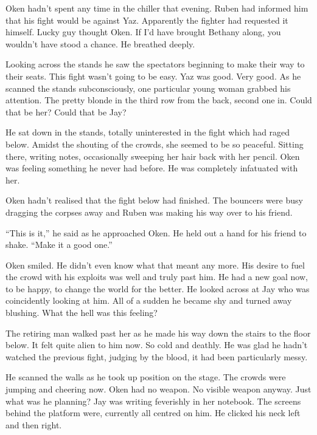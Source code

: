 \thoughtbreak



Oken hadn't spent any time in the chiller that evening.  Ruben had informed him that his fight would be against Yaz.  Apparently the fighter had requested it himself.  Lucky guy thought Oken.  If I'd have brought Bethany along, you wouldn't have stood a chance.  He breathed deeply.

Looking across the stands he saw the spectators beginning to make their way to their seats.  This fight wasn't going to be easy.  Yaz was good.  Very good.  As he scanned the stands subconsciously, one particular young woman grabbed his attention.  The pretty blonde in the third row from the back, second one in.  Could that be her?  Could that be Jay?

He sat down in the stands, totally uninterested in the fight which had raged below.  Amidst the shouting of the crowds, she seemed to be so peaceful.  Sitting there, writing notes, occasionally sweeping her hair back with her pencil.  Oken was feeling something he never had before.  He was completely infatuated with her.  

Oken hadn't realised that the fight below had finished.  The bouncers were busy dragging the corpses away and Ruben was making his way over to his friend.  

``This is it,'' he said as he approached Oken.  He held out a hand for his friend to shake.  ``Make it a good one.''

Oken smiled.  He didn't even know what that meant any more.  His desire to fuel the crowd with his exploits was well and truly past him.  He had a new goal now, to be happy, to change the world for the better.  He looked across at Jay who was coincidently looking at him.  All of a sudden he became shy and turned away blushing.  What the hell was this feeling?

The retiring man walked past her as he made his way down the stairs to the floor below.  It felt quite alien to him now.  So cold and deathly.  He was glad he hadn't watched the previous fight, judging by the blood, it had been particularly messy.  

He scanned the walls as he took up position on the stage.  The crowds were jumping and cheering now.  Oken had no weapon.  No visible weapon anyway.  Just what was he planning?  Jay was writing feverishly in her notebook.  The screens behind the platform were, currently all centred on him.  He clicked his neck left and then right.

